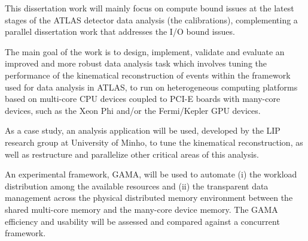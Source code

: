 This dissertation work will mainly focus on compute bound issues at the latest stages of the ATLAS detector data analysis (the calibrations), complementing a parallel dissertation work that addresses the I/O bound issues.

The main goal of the work is to design, implement, validate and evaluate an improved and more robust data analysis task which involves tuning the performance of the kinematical reconstruction of events within the framework used for data analysis in ATLAS, to run on heterogeneous computing platforms based on multi-core CPU devices coupled to PCI-E boards with many-core devices, such as the \intel Xeon Phi and/or the \nvidia Fermi/Kepler GPU devices.

As a case study, an analysis application will be used, developed by the LIP research group at University of Minho, to tune the kinematical reconstruction, as well as restructure and parallelize other critical areas of this analysis.

An experimental framework, GAMA, will be used to automate (i) the workload distribution among the available resources and (ii) the transparent data management across the physical distributed memory environment between the shared multi-core memory and the many-core device memory. The GAMA efficiency and usability will be assessed and compared against a concurrent framework.

\newpage
{}
